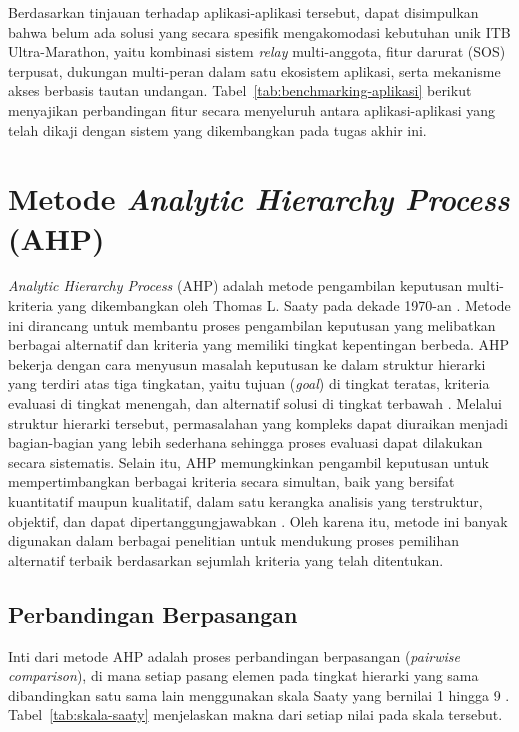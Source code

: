 Berdasarkan tinjauan terhadap aplikasi-aplikasi tersebut, dapat disimpulkan bahwa belum ada solusi yang secara spesifik mengakomodasi kebutuhan unik ITB Ultra-Marathon, yaitu kombinasi sistem \textit{relay} multi-anggota, fitur darurat (SOS) terpusat, dukungan multi-peran dalam satu ekosistem aplikasi, serta mekanisme akses berbasis tautan undangan. Tabel~\ref{tab:benchmarking-aplikasi} berikut menyajikan perbandingan fitur secara menyeluruh antara aplikasi-aplikasi yang telah dikaji dengan sistem yang dikembangkan pada tugas akhir ini.



\section{Metode \textit{Analytic Hierarchy Process} (AHP)}
\label{sec:ahp}
\textit{Analytic Hierarchy Process} (AHP) adalah metode pengambilan keputusan multi-kriteria yang dikembangkan oleh Thomas L. Saaty pada dekade 1970-an \cite{Saaty1980}. Metode ini dirancang untuk membantu proses pengambilan keputusan yang melibatkan berbagai alternatif dan kriteria yang memiliki tingkat kepentingan berbeda. AHP bekerja dengan cara menyusun masalah keputusan ke dalam struktur hierarki yang terdiri atas tiga tingkatan, yaitu tujuan (\textit{goal}) di tingkat teratas, kriteria evaluasi di tingkat menengah, dan alternatif solusi di tingkat terbawah \cite{saaty2008decision}. Melalui struktur hierarki tersebut, permasalahan yang kompleks dapat diuraikan menjadi bagian-bagian yang lebih sederhana sehingga proses evaluasi dapat dilakukan secara sistematis. Selain itu, AHP memungkinkan pengambil keputusan untuk mempertimbangkan berbagai kriteria secara simultan, baik yang bersifat kuantitatif maupun kualitatif, dalam satu kerangka analisis yang terstruktur, objektif, dan dapat dipertanggungjawabkan \cite{Vaidya2006}. Oleh karena itu, metode ini banyak digunakan dalam berbagai penelitian untuk mendukung proses pemilihan alternatif terbaik berdasarkan sejumlah kriteria yang telah ditentukan.
\subsection{Perbandingan Berpasangan}

Inti dari metode AHP adalah proses perbandingan berpasangan (\textit{pairwise comparison}), di mana setiap pasang elemen pada tingkat hierarki yang sama dibandingkan satu sama lain menggunakan skala Saaty yang bernilai 1 hingga 9 \cite{Saaty1980}. Tabel~\ref{tab:skala-saaty} menjelaskan makna dari setiap nilai pada skala tersebut.

